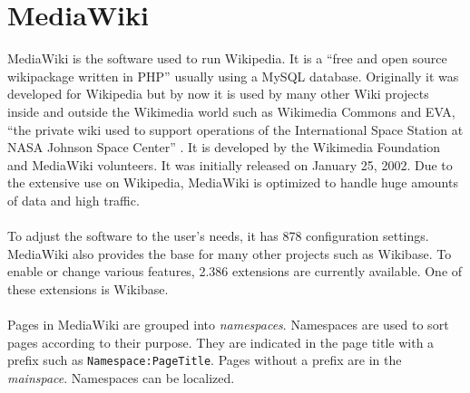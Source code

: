 \section{MediaWiki}

MediaWiki is the software used to run Wikipedia. It is a ``free and open source wikipackage written in PHP'' \citep{wiki:13} usually using a MySQL database. Originally it was developed for Wikipedia but by now it is used by many other Wiki projects inside and outside the Wikimedia world such as Wikimedia Commons and EVA, ``the private wiki used to support operations of the International Space Station at NASA Johnson Space Center'' \citep{eva-nasa}. It is developed by the Wikimedia Foundation and MediaWiki volunteers. It was initially released on January 25, 2002. \citep{wiki:13} Due to the extensive use on Wikipedia, MediaWiki is optimized to handle huge amounts of data and high traffic. \citep{wiki:14} \\
\\
To adjust the software to the user's needs, it has 878 configuration settings. \citep{wiki:15} \\
MediaWiki also provides the base for many other projects such as Wikibase.  To enable or change various features, 2.386 extensions are currently available. \citep{wiki:16} One of these extensions is Wikibase. \\
\\
Pages in MediaWiki are grouped into \textit{namespaces}. Namespaces are used to sort pages according to their purpose. They are indicated in the page title with a prefix such as \texttt{\justify Namespace:PageTitle}. Pages without a prefix are in the \textit{mainspace}. Namespaces can be localized. \citep{wiki:17}